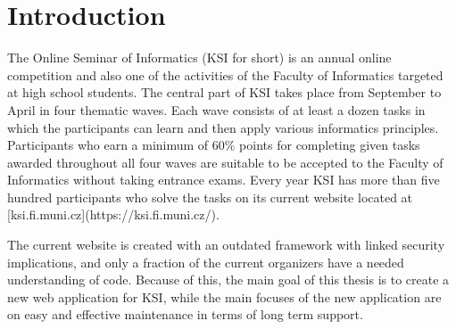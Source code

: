 \documentclass[
  digital, %
  oneside, %
  lof,     %
  nolot,     %
]{fithesis4}
\begin{document}
\clearpage
\printnoidxglossary[title={Abbreviations}, type=\acronymtype]
\printnoidxglossary[title={Glossary}]

\chapter*{Introduction}

\mdstart

The Online Seminar of Informatics (KSI for short) is an annual online competition and also one of the activities of the Faculty of Informatics targeted at high school students. The central part of KSI takes place from September to April in four thematic waves. Each wave consists of at least a dozen tasks in which the participants can learn and then apply various informatics principles. Participants who earn a minimum of 60\% points for completing given tasks awarded throughout all four waves are suitable to be accepted to the Faculty of Informatics without taking entrance exams. Every year KSI has more than five hundred participants who solve the tasks on its current website located at [ksi.fi.muni.cz](https://ksi.fi.muni.cz/).

The current website is created with an outdated framework with linked security implications, and only a fraction of the current organizers have a needed understanding of code. Because of this, the main goal of this thesis is to create a new web application for KSI, while the main focuses of the new application are on easy and effective maintenance in terms of long term support.
\end{document}
